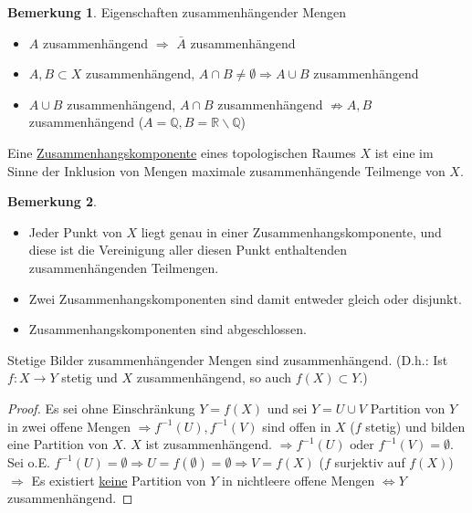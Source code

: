 \documentclass[a4paper,11pt,notitlepage]{report}
\theoremstyle{definition}
\newtheorem{remark}{Bemerkung}[chapter]
\newcommand{\R}{{\ensuremath{\mathbb{R}}}}
\newcommand{\Q}{{\ensuremath{\mathbb{Q}}}}
\newenvironment{definition}[1]{
	\begin{definitions}
	\marginnote{\emph{#1}}
}{\end{definitions}}
\begin{document}
\begin{remark}{Eigenschaften zusammenhängender Mengen}
	\begin{itemize}
		\item $A$ zusammenhängend $\Rightarrow$ $\bar{A}$ zusammenhängend
		\item $A,B \subset X$ zusammenhängend, $A \cap B \neq \emptyset \Rightarrow A \cup B$ zusammenhängend
		\item $A \cup B$ zusammenhängend, $A \cap B$ zusammenhängend $\not\Rightarrow A,B$ zusammenhängend ($A = \Q, B = \R \backslash \Q$)
	\end{itemize}
\end{remark}

\begin{definition}{Zusammenhangskomponente}
	Eine \underline{Zusammenhangskomponente} eines topologischen Raumes $X$ ist eine im Sinne der Inklusion von Mengen maximale zusammenhängende Teilmenge von $X$.
\end{definition}

\begin{remark}{}
	\begin{itemize}
		\item Jeder Punkt von $X$ liegt genau in einer Zusammenhangskomponente, und diese ist die Vereinigung aller diesen Punkt enthaltenden zusammenhängenden Teilmengen.
		\item Zwei Zusammenhangskomponenten sind damit entweder gleich oder disjunkt.
		\item Zusammenhangskomponenten sind abgeschlossen.
	\end{itemize}
\end{remark}

\begin{theorem}
	Stetige Bilder zusammenhängender Mengen sind zusammenhängend.
	\newline
	(D.h.: Ist $f \colon X \rightarrow Y$ stetig und $X$ zusammenhängend, so auch $f(X)\subset Y$.)
\end{theorem}

\begin{proof}
	Es sei ohne Einschränkung $Y=f(X)$ und sei $Y=U \cup V$ Partition von $Y$ in zwei offene Mengen $\Rightarrow f^{-1}(U), f^{-1}(V)$ sind offen in $X$ ($f$ stetig) und bilden eine Partition von $X$. $X$ ist zusammenhängend.
	$\Rightarrow f^{-1}(U) \text{ oder } f^{-1}(V) = \emptyset$.
	\newline
	Sei o.E. $f^{-1}(U) = \emptyset \Rightarrow U = f(\emptyset) = \emptyset \Rightarrow V = f(X)$ ($f$ surjektiv auf $f(X)$)
	\newline
	$\Rightarrow$ Es existiert \underline{keine} Partition von $Y$ in nichtleere offene Mengen $\Leftrightarrow Y$ zusammenhängend.
\end{proof}
\end{document}

